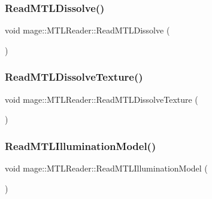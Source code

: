\hypertarget{classmage_1_1_m_t_l_reader_a788a80ec60a2e50c1017630afb607f1c}{}\label{classmage_1_1_m_t_l_reader_a788a80ec60a2e50c1017630afb607f1c} 
\subsubsection{\texorpdfstring{Read\+M\+T\+L\+Dissolve()}{ReadMTLDissolve()}}
{\footnotesize\ttfamily void mage\+::\+M\+T\+L\+Reader\+::\+Read\+M\+T\+L\+Dissolve (\begin{DoxyParamCaption}{ }\end{DoxyParamCaption})\hspace{0.3cm}{\ttfamily [private]}}

\hypertarget{classmage_1_1_m_t_l_reader_aae7a327ad0c5223041c9e849ea2a88d7}{}\label{classmage_1_1_m_t_l_reader_aae7a327ad0c5223041c9e849ea2a88d7} 
\subsubsection{\texorpdfstring{Read\+M\+T\+L\+Dissolve\+Texture()}{ReadMTLDissolveTexture()}}
{\footnotesize\ttfamily void mage\+::\+M\+T\+L\+Reader\+::\+Read\+M\+T\+L\+Dissolve\+Texture (\begin{DoxyParamCaption}{ }\end{DoxyParamCaption})\hspace{0.3cm}{\ttfamily [private]}}

\hypertarget{classmage_1_1_m_t_l_reader_a77bbb659fe66e9bad451281dbd0c49d7}{}\label{classmage_1_1_m_t_l_reader_a77bbb659fe66e9bad451281dbd0c49d7} 
\subsubsection{\texorpdfstring{Read\+M\+T\+L\+Illumination\+Model()}{ReadMTLIlluminationModel()}}
{\footnotesize\ttfamily void mage\+::\+M\+T\+L\+Reader\+::\+Read\+M\+T\+L\+Illumination\+Model (\begin{DoxyParamCaption}{ }\end{DoxyParamCaption})\hspace{0.3cm}{\ttfamily [private]}}

